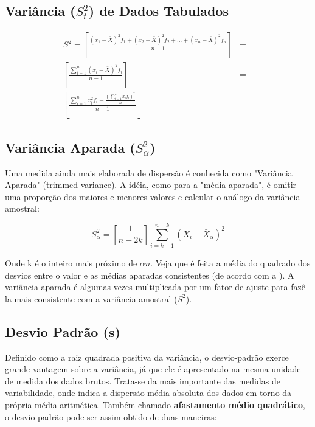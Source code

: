 \subsection{Variância ($S^{2}_{t}$) de Dados Tabulados}


\begin{eqnarray}\nonumber
S^{2} = \left[ \frac{(x_{1}-\bar{X})^{2}f_{1}+(x_{2}-\bar{X})^{2}f_{2}+\ldots+(x_{n}-\bar{X})^{2}f_{n}}{n-1} \right]
    & = &  \\
    \left[ \frac{\sum_{i=1}^{n}(x_{i}-\bar{X})^{2}f_{i}}{n-1} \right]  & = &  \\ \nonumber
    \left[ \frac{\sum_{i=1}^{n}x_{i}^{2}f_{i}-\frac{(\sum_{i=1}^{n}x_{i}f_{i})^{2}}{n}}{n-1} \right] &  &
\end{eqnarray}



\subsection{Variância Aparada ($S_{\alpha}^{2}$)}

Uma medida ainda mais elaborada de dispersão é conhecida como "Variância Aparada" (trimmed variance). A idéia, como para a "média aparada", é omitir uma proporção dos maiores e menores valores e calcular o análogo da variância amostral:

\begin{equation}\label{varAparada}
    S_{\alpha}^{2} = \left[\frac{1}{n-2k}\right]\sum_{i=k+1}^{n-k}(X_{i}-\bar{X}_{\alpha})^{2}
\end{equation}


Onde k é o inteiro mais próximo de $\alpha n$. Veja que é feita a média do quadrado dos desvios entre o valor e as médias aparadas consistentes (de acordo com a \label{aparada}). A variância aparada é algumas vezes multiplicada por um fator de ajuste para fazê-la mais consistente com a variância amostral ($S^{2}$).


\subsection{Desvio Padrão (s)}

Definido como a raiz quadrada positiva da variância, o desvio-padrão exerce grande vantagem sobre a variância, já que ele é apresentado na mesma unidade de medida dos dados brutos. Trata-se da mais importante das medidas de variabilidade, onde indica a dispersão média absoluta dos dados em torno da própria média aritmética. Também chamado \textbf{afastamento médio quadrático}, o desvio-padrão pode ser assim obtido de duas maneiras:\vskip0.3cm

